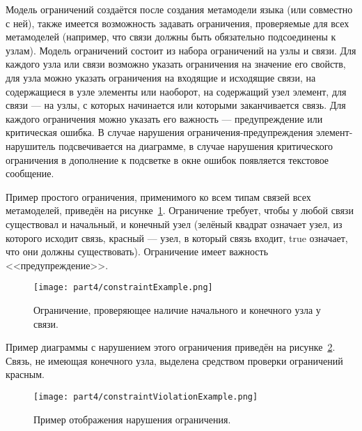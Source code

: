 Модель ограничений создаётся после создания метамодели языка (или совместно с ней), 
также имеется возможность задавать ограничения, проверяемые для всех метамоделей (например, 
что связи должны быть обязательно подсоединены к узлам). Модель ограничений состоит 
из набора ограничений на узлы и связи. Для каждого узла или связи возможно указать 
ограничения на значение его свойств, для узла можно указать ограничения на входящие 
и исходящие связи, на содержащиеся в узле элементы или наоборот, на содержащий узел 
элемент, для связи --- на узлы, с которых начинается или которыми заканчивается связь. 
Для каждого ограничения можно указать его важность --- предупреждение или критическая 
ошибка. В случае нарушения ограничения-предупреждения элемент-нарушитель подсвечивается 
на диаграмме, в случае нарушения критического ограничения в дополнение к подсветке в 
окне ошибок появляется текстовое сообщение. 

Пример простого ограничения, применимого ко всем типам связей всех метамоделей, приведён 
на рисунке~\ref{image:constraintExample}. Ограничение требует, чтобы у любой связи существовал и начальный, и конечный 
узел (зелёный квадрат означает узел, из которого исходит связь, красный --- узел, в 
который связь входит, true означает, что они должны существовать). Ограничение имеет 
важность <<предупреждение>>.

\begin{figure} [ht]
	\begin{center}
		\texttt{[image: part4/constraintExample.png]}
		\caption{Ограничение, проверяющее наличие начального и конечного узла у связи.}
		\label{image:constraintExample}
	\end{center}
\end{figure}

Пример диаграммы с нарушением этого ограничения приведён на рисунке~\ref{image:constraintViolationExample}. 
Связь, не имеющая конечного узла, выделена средством проверки ограничений красным.

\begin{figure} [ht]
	\begin{center}
		\texttt{[image: part4/constraintViolationExample.png]}
		\caption{Пример отображения нарушения ограничения.}
		\label{image:constraintViolationExample}
	\end{center}
\end{figure}

